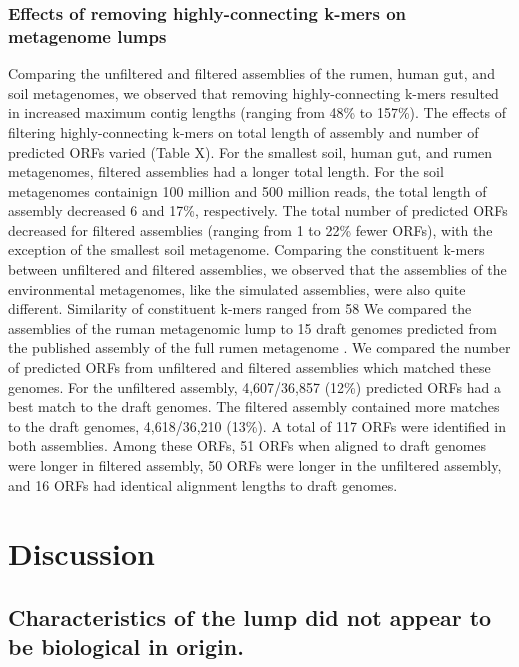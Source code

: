 \documentclass[11pt]{article} %
\begin{document}
\subsubsection{Effects of removing highly-connecting k-mers on metagenome lumps}
Comparing the unfiltered and filtered assemblies of the rumen, human gut, and soil metagenomes, we observed that removing highly-connecting k-mers resulted in increased maximum contig lengths (ranging from 48\% to 157\%).   The effects of filtering highly-connecting k-mers on total length of assembly and number of predicted ORFs varied (Table X).   For the smallest soil, human gut, and rumen metagenomes, filtered assemblies had a longer total length.  For the soil metagenomes containign 100 million and 500 million reads, the total length of assembly decreased 6 and 17\%, respectively.  The total number of predicted ORFs decreased for filtered assemblies (ranging from 1 to 22\% fewer ORFs), with the exception of the smallest soil metagenome.  Comparing the constituent k-mers between unfiltered and filtered assemblies, we observed that the assemblies of the environmental metagenomes, like the simulated assemblies, were also quite different.  Similarity of constituent k-mers ranged from 58%
	We compared the assemblies of the ruman metagenomic lump to 15 draft genomes predicted from the published assembly of the full rumen metagenome \cite{Hess:2011p686}.  We compared the number of predicted ORFs from unfiltered and filtered assemblies which matched these genomes.  For the unfiltered assembly, 4,607/36,857 (12\%) predicted ORFs had a best match to the draft genomes.  The filtered assembly contained more matches to the draft genomes, 4,618/36,210 (13\%).  A total of 117 ORFs were identified in both assemblies.  Among these ORFs, 51 ORFs when aligned to draft genomes were longer in filtered assembly, 50 ORFs were longer in the unfiltered assembly, and 16 ORFs had identical alignment lengths to draft genomes.  

\section{Discussion}

\subsection{Characteristics of the lump did not appear to be biological in origin.}
\end{document}
